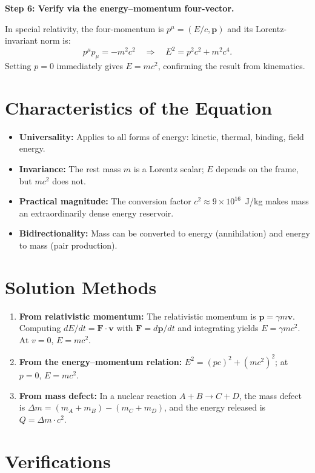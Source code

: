 \textbf{Step 6: Verify via the energy--momentum four-vector.}

In special relativity, the four-momentum is $p^{\mu} = (E/c, \mathbf{p})$ and its Lorentz-invariant norm is:
\begin{equation}
p^{\mu}p_{\mu} = -m^{2}c^{2} \quad\Longrightarrow\quad E^{2} = p^{2}c^{2} + m^{2}c^{4}.
\end{equation}
Setting $p = 0$ immediately gives $E = mc^{2}$, confirming the result from kinematics.

\section*{Characteristics of the Equation}

\begin{itemize}
  \item \textbf{Universality:} Applies to all forms of energy: kinetic, thermal, binding, field energy.
  \item \textbf{Invariance:} The rest mass $m$ is a Lorentz scalar; $E$ depends on the frame, but $mc^{2}$ does not.
  \item \textbf{Practical magnitude:} The conversion factor $c^{2} \approx 9 \times 10^{16}$~J/kg makes mass an extraordinarily dense energy reservoir.
  \item \textbf{Bidirectionality:} Mass can be converted to energy (annihilation) and energy to mass (pair production).
\end{itemize}
\section*{Solution Methods}

\begin{enumerate}
  \item \textbf{From relativistic momentum:} The relativistic momentum is $\mathbf{p} = \gamma m\mathbf{v}$. Computing $dE/dt = \mathbf{F}\cdot\mathbf{v}$ with $\mathbf{F} = d\mathbf{p}/dt$ and integrating yields $E = \gamma mc^{2}$. At $v = 0$, $E = mc^{2}$.
  \item \textbf{From the energy--momentum relation:} $E^{2} = (pc)^{2} + (mc^{2})^{2}$; at $p = 0$, $E = mc^{2}$.
  \item \textbf{From mass defect:} In a nuclear reaction $A + B \to C + D$, the mass defect is $\Delta m = (m_{A} + m_{B}) - (m_{C} + m_{D})$, and the energy released is $Q = \Delta m \cdot c^{2}$.
\end{enumerate}
\section*{Verifications}

